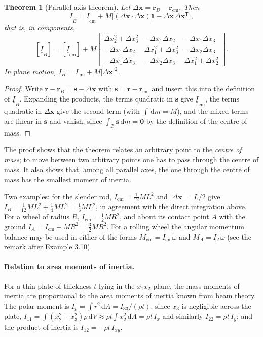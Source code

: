 \documentclass[11pt,a4paper,oneside]{report}
\numberwithin{equation}{chapter}
\newcommand{\vect}[1]{\bm{#1}}
\newcommand{\tens}[1]{\underline{\underline{#1}}}
\newcommand{\dd}{\,\mathrm{d}}
\newcommand{\Id}{\tens{\mathbb{1}}}
\newcommand{\cm}{\mathrm{cm}}
\theoremstyle{plain}
\newtheorem{theorem}{Theorem}[chapter]
\theoremstyle{definition}
\theoremstyle{remark}
\begin{document}
\begin{theorem}[Parallel axis theorem]
Let $\Delta\vect x=\vect r_B-\vect r_\cm$. Then
\begin{equation}
  \tens I_B=\tens I_\cm+M\big[(\Delta\vect x\cdot\Delta\vect x)\Id-\Delta\vect x\,\Delta\vect x^{\mathsf T}\big],
\end{equation}
that is, in components,
\[
  [\tens I_B]=[\tens I_\cm]+M\begin{bmatrix}
    \Delta x_2^2+\Delta x_3^2 & -\Delta x_1\Delta x_2 & -\Delta x_1\Delta x_3\\
    -\Delta x_1\Delta x_2 & \Delta x_1^2+\Delta x_3^2 & -\Delta x_2\Delta x_3\\
    -\Delta x_1\Delta x_3 & -\Delta x_2\Delta x_3 & \Delta x_1^2+\Delta x_2^2
  \end{bmatrix}.
\]
In plane motion, $I_B=I_\cm+M|\Delta\vect x|^2$.
\end{theorem}
\begin{proof}
Write $\vect r-\vect r_B=\vect s-\Delta\vect x$ with $\vect s=\vect r-\vect r_\cm$ and insert this into the definition of
$\tens I_B$. Expanding the products, the terms quadratic in $\vect s$ give $\tens I_\cm$, the terms quadratic in
$\Delta\vect x$ give the second term (with $\int\dd m=M$), and the mixed terms are linear in $\vect s$ and vanish, since
$\int_{\mathcal B}\vect s\dd m=\vect 0$ by the definition of the centre of mass.
\end{proof}
The proof shows that the theorem relates an arbitrary point to the \emph{centre of mass}; to move between two arbitrary
points one has to pass through the centre of mass. It also shows that, among all parallel axes, the one through the
centre of mass has the smallest moment of inertia.

Two examples: for the slender rod, $I_\cm=\frac1{12}ML^2$ and $|\Delta\vect x|=L/2$ give
$I_B=\frac1{12}ML^2+\frac14ML^2=\frac13ML^2$, in agreement with the direct integration above. For a wheel of radius $R$,
$I_\cm=\frac12MR^2$, and about its contact point $A$ with the ground $I_A=I_\cm+MR^2=\frac32MR^2$. For a rolling
wheel the angular momentum balance may be used in either of the forms $M_\cm=I_\cm\dot\omega$ and $M_A=I_A\dot\omega$
(see the remark after Example 3.10).

\paragraph{Relation to area moments of inertia.}
For a thin plate of thickness $t$ lying in the $x_1x_2$-plane, the mass moments of inertia are proportional to the
area moments of inertia known from beam theory. The polar moment is $I_p=\int r^2\dd A=I_{33}/(\rho t)$; since $x_3$ is
negligible across the plate, $I_{11}=\int(x_2^2+x_3^2)\rho\dd V\approx\rho t\int x_2^2\dd A=\rho t\,I_x$ and similarly
$I_{22}=\rho t\,I_y$; and the product of inertia is $I_{12}=-\rho t\,I_{xy}$.
\end{document}
